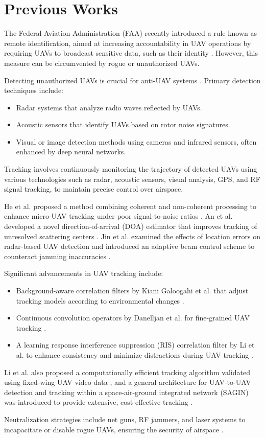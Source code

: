\section{Previous Works}
The Federal Aviation Administration (FAA) recently introduced a rule known as remote identification, aimed at increasing accountability in UAV operations by requiring UAVs to broadcast sensitive data, such as their identity \cite{Tedeschi2024, FAA2023}. However, this measure can be circumvented by rogue or unauthorized UAVs.

Detecting unauthorized UAVs is crucial for anti-UAV systems \cite{Sadovskis2022}. Primary detection techniques \cite{Zhang2023, You2023, Lee2023} include:
\begin{itemize}
  \item Radar systems that analyze radio waves reflected by UAVs.
  \item Acoustic sensors that identify UAVs based on rotor noise signatures.
  \item Visual or image detection methods using cameras and infrared sensors, often enhanced by deep neural networks.
\end{itemize}

Tracking involves continuously monitoring the trajectory of detected UAVs using various technologies such as radar, acoustic sensors, visual analysis, GPS, and RF signal tracking, to maintain precise control over airspace.

He et al. proposed a method combining coherent and non-coherent processing to enhance micro-UAV tracking under poor signal-to-noise ratios \cite{He2023}. An et al. developed a novel direction-of-arrival (DOA) estimator that improves tracking of unresolved scattering centers \cite{An2024}. Jin et al. examined the effects of location errors on radar-based UAV detection and introduced an adaptive beam control scheme to counteract jamming inaccuracies \cite{Jin2024}.

Significant advancements in UAV tracking include:
\begin{itemize}
  \item Background-aware correlation filters by Kiani Galoogahi et al. that adjust tracking models according to environmental changes \cite{KianiGaloogahi2017}.
  \item Continuous convolution operators by Danelljan et al. for fine-grained UAV tracking \cite{Danelljan2016}.
  \item A learning response interference suppression (RIS) correlation filter by Li et al. to enhance consistency and minimize distractions during UAV tracking \cite{Li2023a}.
\end{itemize}
Li et al. also proposed a computationally efficient tracking algorithm validated using fixed-wing UAV video data \cite{Li2022}, and a general architecture for UAV-to-UAV detection and tracking within a space-air-ground integrated network (SAGIN) was introduced to provide extensive, cost-effective tracking \cite{Li2023}.

Neutralization strategies include net guns, RF jammers, and laser systems to incapacitate or disable rogue UAVs, ensuring the security of airspace \cite{Park2021, Jurn2021}.
